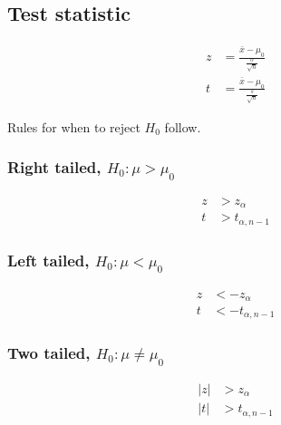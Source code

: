 \documentclass{article}
\begin{document}
\begin{multicols*}{2}
\subsection{Test statistic}
\begin{align*}
    z &= \frac{\bar{x} - \mu_0}{\frac{\sigma}{\sqrt{n}}} \\
    t &= \frac{\bar{x} - \mu_0}{\frac{s}{\sqrt{n}}}
\end{align*}

Rules for when to reject $H_0$ follow.

\subsubsection{Right tailed, $H_0 : \mu > \mu_0$}
\begin{align*}
    z &> z_\alpha \\
    t &> t_{\alpha, n - 1}
\end{align*}

\subsubsection{Left tailed, $H_0 : \mu < \mu_0$}
\begin{align*}
    z &< -z_\alpha \\
    t &< -t_{\alpha, n - 1}
\end{align*}

\subsubsection{Two tailed, $H_0 : \mu \neq \mu_0$}
\begin{align*}
    |z| &> z_\alpha \\
    |t| &> t_{\alpha, n - 1}
\end{align*}

\end{multicols*}
\end{document}
